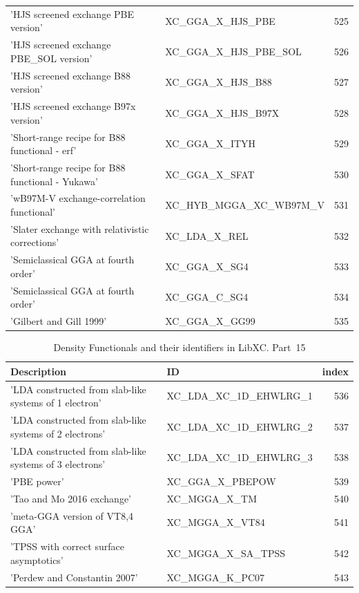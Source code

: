 \documentclass[final,12pt,makeidx,DIV=calc]{article}
\begin{document}
{{{\begin{table}[!h]
\begin{center}
\begin{tabular}{llr}
  'HJS screened exchange PBE version' & XC\_GGA\_X\_HJS\_PBE  &525\\
  'HJS screened exchange PBE\_SOL version' & XC\_GGA\_X\_HJS\_PBE\_SOL  &526\\
  'HJS screened exchange B88 version' & XC\_GGA\_X\_HJS\_B88  &527\\
  'HJS screened exchange B97x version' & XC\_GGA\_X\_HJS\_B97X  &528\\
  'Short-range recipe for B88 functional - erf' & XC\_GGA\_X\_ITYH  &529\\
  'Short-range recipe for B88 functional - Yukawa' & XC\_GGA\_X\_SFAT  &530\\
  'wB97M-V exchange-correlation functional' & XC\_HYB\_MGGA\_XC\_WB97M\_V  &531\\
  'Slater exchange with relativistic corrections' & XC\_LDA\_X\_REL  &532\\
  'Semiclassical GGA at fourth order' & XC\_GGA\_X\_SG4  &533\\
  'Semiclassical GGA at fourth order' & XC\_GGA\_C\_SG4  &534\\
  'Gilbert and Gill 1999' & XC\_GGA\_X\_GG99  &535\\
\end{tabular}
\end{center}
\end{table}

\begin{table}[!h]
\caption{Density Functionals and their identifiers in LibXC. Part~15}
\begin{center}
\begin{tabular}{llr}
\hline
\hline
Description & ID & index\\
\hline
  'LDA constructed from slab-like systems of 1 electron' & XC\_LDA\_XC\_1D\_EHWLRG\_1  &536\\
  'LDA constructed from slab-like systems of 2 electrons' & XC\_LDA\_XC\_1D\_EHWLRG\_2  &537\\
  'LDA constructed from slab-like systems of 3 electrons' & XC\_LDA\_XC\_1D\_EHWLRG\_3  &538\\
  'PBE power' & XC\_GGA\_X\_PBEPOW  &539\\
  'Tao and Mo 2016 exchange' & XC\_MGGA\_X\_TM  &540\\
  'meta-GGA version of VT{8,4} GGA' & XC\_MGGA\_X\_VT84  &541\\
  'TPSS with correct surface asymptotics' & XC\_MGGA\_X\_SA\_TPSS  &542\\
  'Perdew and Constantin 2007' & XC\_MGGA\_K\_PC07  &543\\
\end{tabular}
\end{center}
\end{table}

}}}
\end{document}
